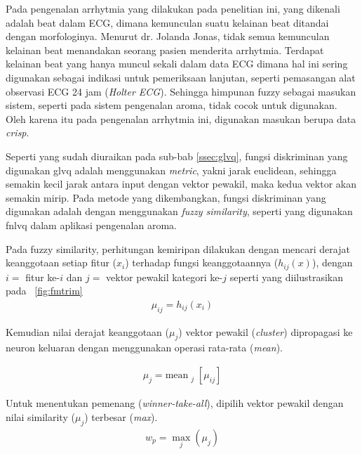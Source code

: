 
Pada pengenalan arrhytmia yang dilakukan pada penelitian ini, yang dikenali
adalah beat dalam ECG, dimana kemunculan suatu kelainan beat ditandai dengan
morfologinya. Menurut dr. Jolanda Jonas, tidak semua kemunculan kelainan beat
menandakan seorang pasien menderita arrhytmia. Terdapat kelainan beat yang hanya muncul
sekali dalam data ECG dimana hal ini sering digunakan sebagai indikasi untuk
pemeriksaan lanjutan, seperti pemasangan alat observasi ECG 24 jam
(\emph{Holter ECG}). Sehingga himpunan fuzzy sebagai masukan
sistem, seperti pada sistem pengenalan aroma, tidak cocok untuk digunakan. Oleh
karena itu pada pengenalan arrhytmia ini, digunakan masukan berupa data
\emph{crisp}.
 
Seperti yang sudah diuraikan pada sub-bab \ref{ssec:glvq}, fungsi
diskriminan yang digunakan \gls{glvq} adalah menggunakan \emph{\gls{metric}}, 
yakni jarak euclidean, sehingga semakin kecil jarak antara input dengan vektor
pewakil, maka kedua vektor akan semakin mirip. Pada metode yang dikembangkan,
fungsi diskriminan yang digunakan adalah dengan menggunakan \emph{fuzzy similarity},
seperti yang digunakan \gls{fnlvq} dalam aplikasi pengenalan aroma.


Pada fuzzy similarity, perhitungan kemiripan dilakukan dengan mencari derajat
keanggotaan setiap fitur ($x_i$) terhadap fungsi keanggotaannya ($h_{ij}(x)$), 
dengan $i=$ fitur ke-$i$ dan $j=$ vektor pewakil kategori ke-$j$ seperti yang
diilustrasikan pada \pic~\ref{fig:fmtrim}
\begin{align}
	\mu_{ij} = h_{ij}(x_i)
\end{align}

Kemudian nilai derajat keanggotaan ($\mu_{j}$) vektor pewakil
(\emph{cluster}) dipropagasi ke neuron keluaran dengan menggunakan operasi
rata-rata (\emph{mean}).

\begin{align}
	\mu_j = \text{mean}_{\substack{j}} [\mu_{ij}]
\end{align}

Untuk menentukan pemenang (\emph{winner-take-all}), dipilih vektor
pewakil dengan nilai similarity ($\mu_j$) terbesar (\emph{max}).  
\begin{align}
	w_p = \max_j ( \mu_j )
\end{align}

